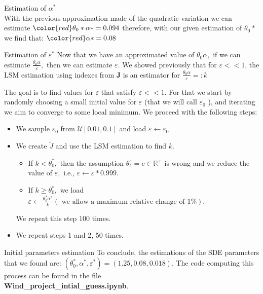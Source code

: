 \documentclass{beamer}
\begin{document}
 \begin{frame}{Estimation of $\alpha^{*}$}
\justifying
\\ With the previous approximation made of the quadratic variation we can estimate $\color{red} \theta_{0}*\alpha*=0.094$ therefore, with our given estimation of $\theta_{0}*$ we find that: $\color{red} \alpha*=0.08$
\end{frame}
 
 \begin{frame}{Estimation of $\varepsilon^{*}$}
\justifying
Now that we have an approximated value of $\theta_{0} \alpha,$ if we can estimate $\frac{\theta_{0} \alpha}{\varepsilon},$ then we can estimate $\varepsilon$.
We showed previously that for $\varepsilon<<1$, the LSM estimation using indexes from $\mathbf{J}$ is an estimator for $\frac{\theta_{0} \alpha}{\varepsilon}=: k$

The goal is to find values for $\varepsilon$ that satisfy $\varepsilon<<1$. For that we start by randomly choosing a small initial value for $\varepsilon$ (that we will call $\varepsilon_{0}$ ), and iterating we aim to converge to some local minimum. We proceed with the following steps:
\begin{itemize}
\justifying
\item We sample $\varepsilon_{0}$ from $\mathscr{U}[0.01,0.1]$ and load $\varepsilon \leftarrow \varepsilon_{0}$
\item We create $\tilde{J}$ and use the LSM estimation to find $k$. 
\begin{itemize}
\item If $k<\theta_{0}^{*},$ then the assumption $\theta_{t}^{\varepsilon}=c \in \mathbb{R}^{+}$ is wrong and we reduce the value of $\varepsilon,$ i.e., $\varepsilon \leftarrow \varepsilon * 0.999 .$ 
\item If $k \geq \theta_{0}^{*},$ we load $\varepsilon \leftarrow \frac{\theta_{0}^{*} \alpha^{*}}{k}(\text { we allow a maximum relative change of } 1 \%) .$
\end{itemize}
 We repeat this step 100 times.
\item We repeat steps 1 and 2, 50 times.
\end{itemize}
 \end{frame}	
 
 \begin{frame}{Initial parameters estimation}
\justifying
 To conclude, the estimations of the SDE parameters that we found are: $\left(\theta_{0}^{*}, \alpha^{*}, \varepsilon^{*}\right)=(1.25,0.08,0.018).$
 \vskip 0.5cm
 The code computing this process can be found in the file\\  \textbf{Wind\_}\textbf{project\_}\textbf{intial\_}\textbf{guess.ipynb}.
 \end{frame}
 
\end{document}
